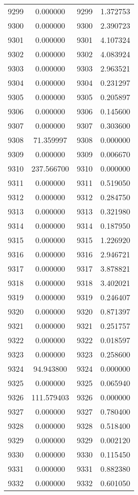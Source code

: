 \documentclass[12pt]{article}
\begin{document}
\begin{longtable}{@{}cccc@{}}
9299 & 0.000000 & 9299 & 1.372753 \\
9300 & 0.000000 & 9300 & 2.390723 \\
9301 & 0.000000 & 9301 & 4.107324 \\
9302 & 0.000000 & 9302 & 4.083924 \\
9303 & 0.000000 & 9303 & 2.963521 \\
9304 & 0.000000 & 9304 & 0.231297 \\
9305 & 0.000000 & 9305 & 0.205897 \\
9306 & 0.000000 & 9306 & 0.145600 \\
9307 & 0.000000 & 9307 & 0.303600 \\
9308 & 71.359997 & 9308 & 0.000000 \\
9309 & 0.000000 & 9309 & 0.006670 \\
9310 & 237.566700 & 9310 & 0.000000 \\
9311 & 0.000000 & 9311 & 0.519050 \\
9312 & 0.000000 & 9312 & 0.284750 \\
9313 & 0.000000 & 9313 & 0.321980 \\
9314 & 0.000000 & 9314 & 0.187950 \\
9315 & 0.000000 & 9315 & 1.226920 \\
9316 & 0.000000 & 9316 & 2.946721 \\
9317 & 0.000000 & 9317 & 3.878821 \\
9318 & 0.000000 & 9318 & 3.402021 \\
9319 & 0.000000 & 9319 & 0.246407 \\
9320 & 0.000000 & 9320 & 0.871397 \\
9321 & 0.000000 & 9321 & 0.251757 \\
9322 & 0.000000 & 9322 & 0.018597 \\
9323 & 0.000000 & 9323 & 0.258600 \\
9324 & 94.943800 & 9324 & 0.000000 \\
9325 & 0.000000 & 9325 & 0.065940 \\
9326 & 111.579403 & 9326 & 0.000000 \\
9327 & 0.000000 & 9327 & 0.780400 \\
9328 & 0.000000 & 9328 & 0.518400 \\
9329 & 0.000000 & 9329 & 0.002120 \\
9330 & 0.000000 & 9330 & 0.115450 \\
9331 & 0.000000 & 9331 & 0.882380 \\
9332 & 0.000000 & 9332 & 0.601050 \\

\end{longtable}
\end{document}
